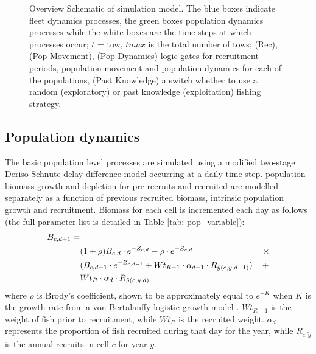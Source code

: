 \documentclass[review]{elsarticle}
\begin{document}
\begin{figure}[!ht]
\caption{Overview Schematic of simulation model. The blue boxes indicate fleet
	dynamics processes, the green boxes population dynamics processes while
	the white boxes are the time steps at which processes occur; $t$ = tow,
	$tmax$ is the total number of tows; (Rec), (Pop Movement), (Pop
	Dynamics) logic gates for recruitment periods, population movement and
	population dynamics for each of the populations, (Past Knowledge) a
	switch whether to use a random (exploratory) or past knowledge
	(exploitation) fishing strategy.}
\label{fig:overview}
\end{figure}

\subsection{Population dynamics}

The basic population level processes are simulated using a modified two-stage
Deriso-Schnute delay difference model \citep{Deriso1980, Schnute1985,
	Dichmont2003} occurring at a daily time-step. 
 population
biomass growth and depletion for pre-recruits and 
recruited   are modelled
separately as a function of previous recruited biomass, intrinsic population
growth and recruitment. Biomass for each cell is incremented each day as
follows (the full parameter list is detailed in Table \ref{tab: pop_variable}):
\begin{equation*}
	\begin{split}
	B_{c,d+1} = &\\
	& (1 + \rho) B_{c,d} \cdot e^{-Z_{c,d}} - \rho \cdot e^{-Z_{c,d}} \hspace{2.9cm}
	\times \\  
	& (B_{c,d-1} \cdot e^{-Z_{c,d-1}} + Wt_{R-1} \cdot \alpha_{d-1} \cdot
	R_{\tilde{y}(c,y,d-1)})
	\hspace{0.4cm} + \\
	& Wt_{R} \cdot \alpha_{d} \cdot R_{\tilde{y}(c,y,d)} 
	\end{split}
\end{equation*}
where $\rho$ is Brody's coefficient, shown to be approximately equal to
$e^{-K}$ when $K$ is the growth rate from a von Bertalanffy logistic growth
model \citep{Schnute1985}. $Wt_{R-1}$ is the weight of fish prior to
recruitment, while $Wt_{R}$ is the recruited weight. $\alpha_{d}$ represents
the proportion of fish recruited during that day for the year, while
$R_{c,\tilde{y}}$ is the annual recruits in cell $c$ for year $y$. \\
\end{document}
